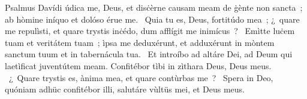 { Psalmus Davídi}
{%
údica me, Deus, et disċèrne causam meam de ġènte non sancta~; ab hòmine iníquo et dolóso érue me. 
~Quia tu es, Deus, fortitúdo mea~; ¿~quare me repulìsti, et quare trystis inċédo, dum afflígit me inimícus~? 
~Emìtte luċem tuam et veritátem tuam~; ìpsa me deduxérunt, et adduxérunt in mòntem sanctum tuum et in tabernácula tua. 
~Et introíbo ad altáre Dei, ad Deum qui laetìficat juventútem meam. Confitébor tìbi in zìthara Deus, Deus meus. 
~¿~Quare trystis es, ànima mea, et quare contùrbas me~?  
~Spera in Deo, quóniam adhüc confitébor illi, salutáre vùltüs mei, et Deus meus. 
}
